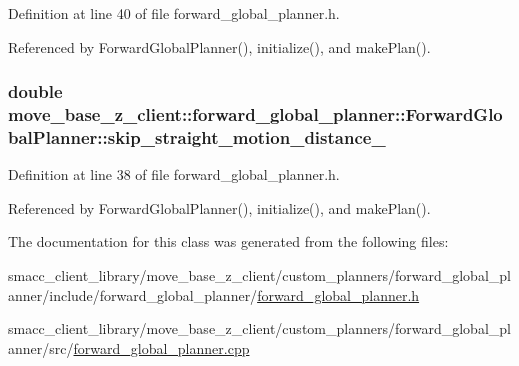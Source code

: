 Definition at line 40 of file forward\+\_\+global\+\_\+planner.\+h.



Referenced by Forward\+Global\+Planner(), initialize(), and make\+Plan().

\subsubsection[{\texorpdfstring{skip\+\_\+straight\+\_\+motion\+\_\+distance\+\_\+}{skip_straight_motion_distance_}}]{\setlength{\rightskip}{0pt plus 5cm}double move\+\_\+base\+\_\+z\+\_\+client\+::forward\+\_\+global\+\_\+planner\+::\+Forward\+Global\+Planner\+::skip\+\_\+straight\+\_\+motion\+\_\+distance\+\_\+\hspace{0.3cm}{\ttfamily [private]}}\hypertarget{classmove__base__z__client_1_1forward__global__planner_1_1ForwardGlobalPlanner_ae33082b9dd81dd3ce8d3e68a6c032c61}{}\label{classmove__base__z__client_1_1forward__global__planner_1_1ForwardGlobalPlanner_ae33082b9dd81dd3ce8d3e68a6c032c61}


Definition at line 38 of file forward\+\_\+global\+\_\+planner.\+h.



Referenced by Forward\+Global\+Planner(), initialize(), and make\+Plan().



The documentation for this class was generated from the following files\+:\begin{DoxyCompactItemize}
\item 
smacc\+\_\+client\+\_\+library/move\+\_\+base\+\_\+z\+\_\+client/custom\+\_\+planners/forward\+\_\+global\+\_\+planner/include/forward\+\_\+global\+\_\+planner/\hyperlink{forward__global__planner_8h}{forward\+\_\+global\+\_\+planner.\+h}\item 
smacc\+\_\+client\+\_\+library/move\+\_\+base\+\_\+z\+\_\+client/custom\+\_\+planners/forward\+\_\+global\+\_\+planner/src/\hyperlink{forward__global__planner_8cpp}{forward\+\_\+global\+\_\+planner.\+cpp}\end{DoxyCompactItemize}
